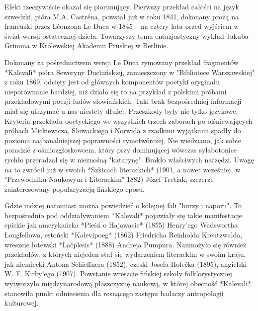 Efekt rzeczywiście okazał się piorunujący. Pierwszy przekład całości na język szwedzki, pióra M.A. Castréna, powstał już w roku 1841, dokonany prozą na francuski przez Léonzona Le Duca w 1845 -- na cztery lata przed wyjściem w świat wersji ostatecznej dzieła. Towarzyszy temu entuzjastyczny wykład Jakuba Grimma w Królewskiej Akademii Pruskiej w Berlinie.

Dokonany za pośrednictwem wersji Le Duca rymowany przekład fragmentów *Kalevali* pióra Seweryny Duchińskiej, zamieszczony w "Bibliotece Warszawskiej" z roku 1869, odcięty jest od głównych komponentów poetyki oryginału nieporównanie bardziej, niż działo się to na przykład z polskimi próbami przekładowymi poezji ludów słowiańskich. Taki brak bezpośredniej informacji miał się utrzymać u nas niestety dłużej. Przeszkody były nie tylko językowe. Kryteria przekładu poetyckiego we wszystkich trzech zaborach po olśniewających próbach Mickiewicza, Słowackiego i Norwida z rzadkimi wyjątkami spadły do poziomu najbanalniejszej poprawności rymotwórczej. Nie wiedziano, jak sobie poradzić z ośmiozgłoskowcem, który przy dominującej wówczas sylabotonice rychło przeradzał się w nieznośną "katarynę". Brakło właściwych narzędzi. Uwagę na to zwrócił już w swoich *Szkicach literackich* (1901, a nawet wcześniej, w "Przewodniku Naukowym i Literackim" 1882) Józef Tretiak, szczerze zainteresowany popularyzacją fińskiego eposu.

Gdzie indziej natomiast można powiedzieć o kolejnej fali "burzy i naporu". To bezpośrednio pod oddziaływaniem *Kalevali* pojawiały się takie manifestacje epickie jak amerykańska *Pieśń o Hajawacie* (1855) Henry'ego Wadswortha Longfellowa, estoński *Kalevipoeg* (1862) Friedricha Reinholda Kreutzwalda, wreszcie łotewski *Lačplesis* (1888) Andreja Pumpura. Namnożyło się również przekładów, z których niejeden stał się wydarzeniem literackim w swoim kraju, jak niemiecki Antona Schieffnera (1852), czeski Josefa Holečka (1895), angielski W. F. Kirby'ego (1907). Powstanie wreszcie fińskiej szkoły folklorystycznej wytworzyło międzynarodową płaszczyznę naukową, w której obecność *Kalevali* stanowiła punkt odniesienia dla rosnącego zastępu badaczy antropologii kulturowej.

